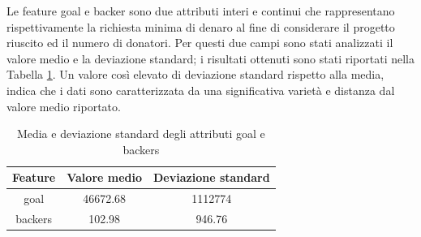 Le feature goal e backer sono due attributi interi e continui che rappresentano rispettivamente la richiesta minima di denaro al fine di considerare il progetto riuscito ed il numero di donatori. Per questi due campi sono stati analizzati il valore medio e la deviazione standard; i risultati ottenuti sono stati riportati nella Tabella \ref{tab:backer}. Un valore così elevato di deviazione standard rispetto alla media, indica che i dati sono caratterizzata da una significativa varietà e distanza dal valore medio riportato.

\begin{table}[h]
	\centering
	\caption{Media e deviazione standard degli attributi goal e backers}
	\begin{tabular}{c|cc}
		Feature & Valore medio & Deviazione standard \\
		\hline  
		goal & 46672.68 & 1112774 \\ 
		backers & 102.98 & 946.76 \\ 
	\end{tabular} 
	\label{tab:backer}
\end{table}

\begin{figure}%
	\centering
	\qquad
	\caption{}%
	\label{fig:piecategory}%
\end{figure}

